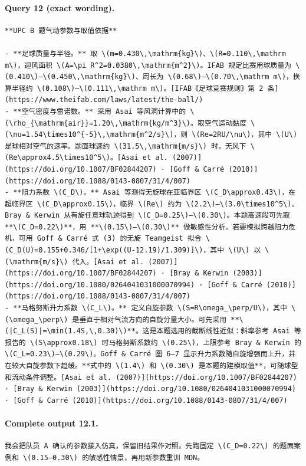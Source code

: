 \documentclass[UTF8,10pt]{ctexart}
\begin{document}
\paragraph{Query 12 (exact wording).}
\begin{Verbatim}[breaklines=true,breakanywhere=true,fontsize=\scriptsize,frame=single,framesep=2pt]
**UPC B 题气动参数与取值依据**

- **足球质量与半径。** 取 \(m=0.430\,\mathrm{kg}\)、\(R=0.110\,\mathrm m\)，迎风面积 \(A=\pi R^2=0.0380\,\mathrm{m^2}\)。IFAB 规定比赛用球质量为 \(0.410\)–\(0.450\,\mathrm{kg}\)、周长为 \(0.68\)–\(0.70\,\mathrm m\)，换算半径约 \(0.108\)–\(0.111\,\mathrm m\)。[IFAB《足球竞赛规则》第 2 条](https://www.theifab.com/laws/latest/the-ball/)
- **空气密度与雷诺数。** 采用 Asai 等风洞计算中的 \(\rho_{\mathrm{air}}=1.20\,\mathrm{kg/m^3}\)。取空气运动黏度 \(\nu=1.54\times10^{-5}\,\mathrm{m^2/s}\)，则 \(Re=2RU/\nu\)，其中 \(U\) 是球相对空气的速率。题面球速约 \(31.5\,\mathrm{m/s}\) 时，无风下 \(Re\approx4.5\times10^5\)。[Asai et al. (2007)](https://doi.org/10.1007/BF02844207) · [Goff & Carré (2010)](https://doi.org/10.1088/0143-0807/31/4/007)
- **阻力系数 \(C_D\)。** Asai 等测得无旋球在亚临界区 \(C_D\approx0.43\)，在超临界区 \(C_D\approx0.15\)，临界 \(Re\) 约为 \(2.2\)–\(3.0\times10^5\)。Bray & Kerwin 从有旋任意球轨迹得到 \(C_D=0.25\)–\(0.30\)。本题高速段可先取 **\(C_D=0.22\)**，用 **\(0.15\)–\(0.30\)** 做敏感性分析。若要模拟跨越阻力危机，可用 Goff & Carré 式 (3) 的无旋 Teamgeist 拟合 \(C_D(U)=0.155+0.346/[1+\exp((U-12.19)/1.309)]\)，其中 \(U\) 以 \(\mathrm{m/s}\) 代入。[Asai et al. (2007)](https://doi.org/10.1007/BF02844207) · [Bray & Kerwin (2003)](https://doi.org/10.1080/0264041031000070994) · [Goff & Carré (2010)](https://doi.org/10.1088/0143-0807/31/4/007)
- **马格努斯升力系数 \(C_L\)。** 定义自旋参数 \(S=R\omega_\perp/U\)，其中 \(\omega_\perp\) 是垂直于相对气流方向的自旋分量大小。可先采用 **\(|C_L(S)|=\min(1.4S,\,0.30)\)**。这是本题选用的截断线性近似：斜率参考 Asai 等报告的 \(S\approx0.18\) 时马格努斯系数约 \(0.25\)，上限参考 Bray & Kerwin 的 \(C_L=0.23\)–\(0.29\)。Goff & Carré 图 6–7 显示升力系数随自旋增强而上升，并在较大自旋参数下趋缓。**式中的 \(1.4\) 和 \(0.30\) 是本题的建模取值**，可随球型和流动条件调整。[Asai et al. (2007)](https://doi.org/10.1007/BF02844207) · [Bray & Kerwin (2003)](https://doi.org/10.1080/0264041031000070994) · [Goff & Carré (2010)](https://doi.org/10.1088/0143-0807/31/4/007)
\end{Verbatim}

\paragraph{Complete output 12.1.}
\begin{Verbatim}[breaklines=true,breakanywhere=true,fontsize=\scriptsize,frame=single,framesep=2pt]
我会把队员 A 确认的参数接入仿真，保留旧结果作对照。先跑固定 \(C_D=0.22\) 的题面案例和 \(0.15–0.30\) 的敏感性情景，再用新参数重训 MDN。
\end{Verbatim}
\end{document}
